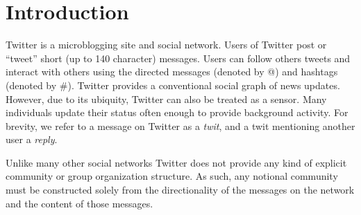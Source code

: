 \section{Introduction}

Twitter is a microblogging site and social network.  Users of Twitter post or ``tweet'' short (up to 140 character) messages.  Users can follow others tweets and interact with others using the directed messages (denoted by @) and hashtags (denoted by \#). Twitter provides a conventional social graph of news updates.  However, due to its ubiquity, Twitter can also be treated as a sensor.  Many individuals update their status often enough to provide background activity.  For brevity, we refer to a message on Twitter as a \emph{twit}, and a twit mentioning another user a \emph{reply}.

Unlike many other social networks Twitter does not provide any kind of explicit community or group organization structure.  As such, any notional community must be constructed solely from the directionality of the messages on the network and the content of those messages.  

